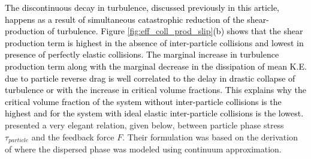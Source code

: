 \documentclass[aip,graphicx]{revtex4-1}
\begin{document}
\textcolor{black}{The discontinuous \textcolor{black}{decay} in turbulence, discussed previously in this article, happens as a result of simultaneous catastrophic reduction of the shear-production of turbulence. Figure  \ref{fig:eff_coll_prod_slip}(b) shows that  the shear production term is highest in the absence of inter-particle collisions and lowest in presence of perfectly elastic collisions. 
The marginal increase in turbulence production term along with the marginal decrease in the dissipation of mean K.E. due to particle reverse drag is well correlated to the delay in drastic collapse of turbulence or with the increase in critical volume fractions.  This explains why the critical volume fraction of the system without inter-particle collisions is the highest and for the system with ideal elastic inter-particle collisions is the lowest.}
\\\citet*{richter2013momentum} presented a very elegant relation, given below, between particle phase stress $\tau_{particle}$ and the feedback force $F$. Their formulation was based on the derivation of \cite{mito2006effect} where the dispersed phase was modeled using continuum approximation. 
\end{document}
